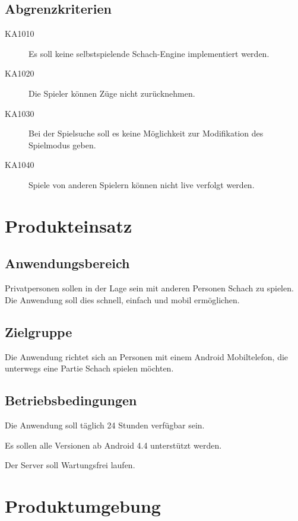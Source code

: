 \documentclass[parskip=full]{scrartcl}
\begin{document}
\subsection{Abgrenzkriterien}
\begin{description}
\item[KA1010] Es soll keine selbstspielende Schach-Engine implementiert werden.
\item[KA1020] Die Spieler können Züge nicht zurücknehmen.
\item[KA1030] Bei der Spielsuche soll es keine Möglichkeit zur Modifikation des Spielmodus geben.
\item[KA1040] Spiele von anderen \gls{Spieler}n können nicht live verfolgt werden.
\end{description}
\newpage
\section{Produkteinsatz}
	\subsection{Anwendungsbereich}
		
			Privatpersonen sollen in der Lage sein mit anderen Personen \gls{Schach} zu spielen. Die Anwendung soll dies schnell, einfach und mobil ermöglichen.	
		
	\subsection{Zielgruppe}
		
			Die Anwendung richtet sich an Personen mit einem Android Mobiltelefon, die unterwegs eine Partie \gls{Schach} spielen möchten.
		
	\subsection{Betriebsbedingungen}
		\begin{description}
			\item Die Anwendung soll täglich 24 Stunden verfügbar sein.
			\item Es sollen alle Versionen ab Android 4.4 unterstützt werden.
			\item Der Server soll Wartungsfrei laufen.	
		\end{description}
	\newpage
\section{Produktumgebung}
\end{document}

